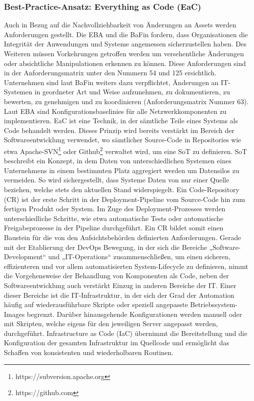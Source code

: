 \subsubsection{Best-Practice-Ansatz: Everything as Code (EaC)}
Auch in Bezug auf die Nachvollziehbarkeit von Änderungen an Assets werden Anforderungen gestellt. Die EBA und die BaFin fordern, dass Organisationen die Integrität der Anwendungen und Systeme angemessen sicherzustellen haben. Des Weiteren müssen Vorkehrungen getroffen werden um versehentliche Änderungen oder absichtliche Manipulationen erkennen zu können. Diese Anforderungen sind in der Anforderungsmatrix unter den Nummern 54 und 125 ersichtlich. Unternehmen sind laut BaFin weiters dazu verpflichtet, Änderungen an IT-Systemen in geordneter Art und Weise aufzunehmen, zu dokumentieren, zu bewerten, zu genehmigen und zu koordinieren (Anforderungsmatrix Nummer 63). Laut EBA sind Konfigurationsbaselinies für alle Netzwerkkomponenten zu implementieren.
\bigbreak
EaC ist eine Technik, in der sämtliche Teile eines Systems als Code behandelt werden. Dieses Prinzip wird bereits verstärkt im Bereich der Softwareentwicklung verwendet, wo sämtlicher Source-Code in Repositories wie etwa Apache-SVN\footnote{https://subversion.apache.org} oder Github\footnote{https://github.com} verwaltet wird, um eine SoT zu definieren. SoT beschreibt ein Konzept, in dem Daten von unterschiedlichen Systemen eines Unternehmens in einem bestimmten Platz aggregiert werden um Datensilos zu vermeiden. So wird sichergestellt, dass Systeme Daten von nur einer Quelle beziehen, welche stets den aktuellen Stand widerspiegelt. Ein \glqq{}Code-Repository\grqq{} (CR) ist der erste Schritt in der Deployment-Pipeline vom Source-Code hin zum fertigen Produkt oder System. Im Zuge des Deployment-Prozesses werden unterschiedliche Schritte, wie etwa automatische Tests oder automatische Freigabeprozesse in der Pipeline durchgeführt. Ein CR bildet somit einen Baustein für die von den Aufsichtsbehörden definierten Anforderungen. \autocite{mulesoft} \autocite{openpracticelibrary}
\bigbreak
Gerade mit der Etablierung der DevOps Bewegung, in der sich die Bereiche „Software- Development“ und „IT-Operations“ zusammenschließen, um einen sicheren, effizienteren und vor allem automatisierten System-Lifecycle zu definieren, nimmt die Vorgehensweise der Behandlung von Komponenten als Code, neben der Softwareentwicklung auch verstärkt Einzug in anderen Bereiche der IT. \autocite{könig_kugel_2019}
\bigbreak
Einer dieser Bereiche ist die IT-Infrastruktur, in der sich der Grad der Automation häufig auf wiederausführbare Skripte oder speziell angepasste Betriebssystem-Images begrenzt. Darüber hinausgehende Konfigurationen werden manuell oder mit Skripten, welche eigens für den jeweiligen Server angepasst werden, durchgeführt. \glqq{}Infrastructure as Code\grqq{} (IaC) übernimmt die Bereitstellung und die Konfiguration der gesamten Infrastruktur im Quellcode und ermöglicht das Schaffen von konsistenten und wiederholbaren Routinen. \autocite{özel_pautz_schmidt_2020}

